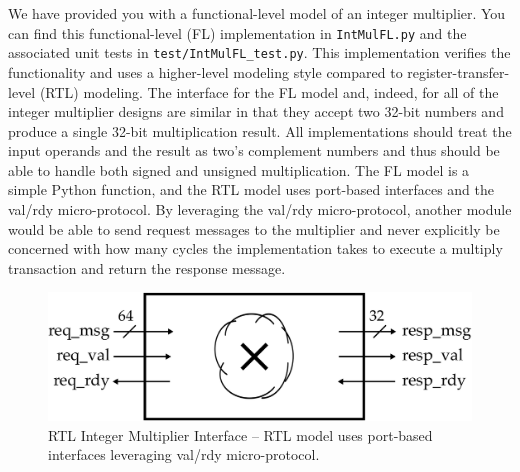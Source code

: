 \documentclass[a4paper,12pt,twoside]{article}
\begin{document}
We have provided you with a functional-level model of an integer multiplier. You can find this functional-level (FL) implementation in \texttt{IntMulFL.py} and the associated unit tests in \texttt{test/IntMulFL\_test.py}. This implementation verifies the functionality and uses a higher-level modeling style compared to register-transfer-level (RTL) modeling. The interface for the FL model and, indeed, for all of the integer multiplier designs are similar in that they accept two 32-bit numbers and produce a single 32-bit multiplication result. All implementations should treat the input operands and the result as two’s complement numbers and thus should be able to handle both signed and unsigned multiplication. The FL model is a simple Python function, and the RTL model uses port-based interfaces and the val/rdy micro-protocol. By leveraging the val/rdy micro-protocol, another module would be able to send request messages to the multiplier and never explicitly be concerned with how many cycles
the implementation takes to execute a multiply transaction and return the response message.
\begin{figure}[H]
    \centering
    \includegraphics[width=\textwidth]{images/17.png}
    \caption{RTL Integer Multiplier Interface – RTL model uses port-based interfaces leveraging val/rdy micro-protocol.}
    \label{F17}
\end{figure}
\end{document}
